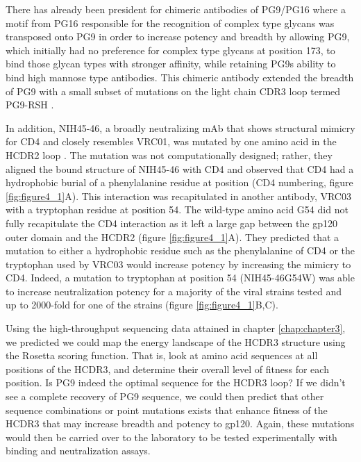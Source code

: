 There has already been president for chimeric antibodies of PG9/PG16 where a motif from PG16 responsible for the recognition of complex type glycans was transposed onto PG9 in order to increase potency and breadth by allowing PG9, which initially had no preference for complex type glycans at position 173, to bind those glycan types with stronger affinity, while retaining PG9s ability to bind high mannose type antibodies. This chimeric antibody extended the breadth of PG9 with a small subset of mutations on the light chain CDR3 loop termed PG9-RSH \citep{Pancera:2013ev}.

In addition, NIH45-46, a broadly neutralizing mAb that shows structural mimicry for CD4 and closely resembles VRC01, was mutated by one amino acid in the HCDR2 loop \citep{Scheid:2011js,Diskin:2011hl}. The mutation was not computationally designed; rather, they aligned the bound structure of NIH45-46 with CD4 and observed that CD4 had a hydrophobic burial of a phenylalanine residue at position (CD4 numbering, figure \ref{fig:figure4_1}A). This interaction was recapitulated in another antibody, VRC03 with a tryptophan residue at position 54. The wild-type amino acid G54 did not fully recapitulate the CD4 interaction as it left a large gap between the gp120 outer domain and the HCDR2 (figure \ref{fig:figure4_1}A). They predicted that a mutation to either a hydrophobic residue such as the phenylalanine of CD4 or the tryptophan used by VRC03 would increase potency by increasing the mimicry to CD4. Indeed, a mutation to tryptophan at position 54 (NIH45-46G54W) was able to increase neutralization potency for a majority of the viral strains tested and up to 2000-fold for one of the strains (figure \ref{fig:figure4_1}B,C).

Using the high-throughput sequencing data attained in chapter \ref{chap:chapter3}, we predicted we could map the energy landscape of the HCDR3 structure using the Rosetta scoring function. That is, look at amino acid sequences at all positions of the HCDR3, and determine their overall level of fitness for each position. Is PG9 indeed the optimal sequence for the HCDR3 loop? If we didn't see a complete recovery of PG9 sequence, we could then predict that other sequence combinations or point mutations exists that enhance fitness of the HCDR3 that may increase breadth and potency to gp120. Again, these mutations would then be carried over to the laboratory to be tested experimentally with binding and neutralization assays.

